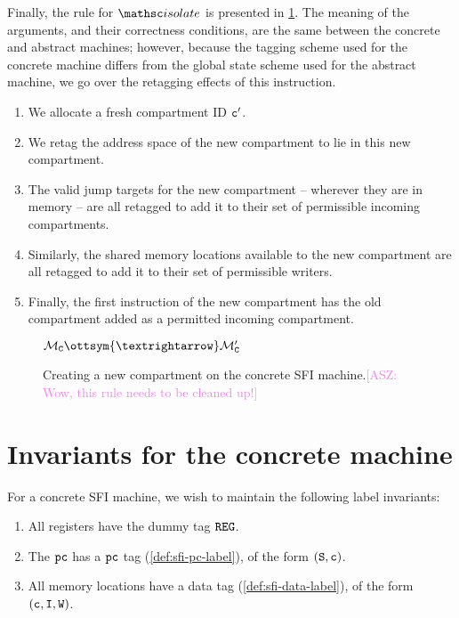 \documentclass[12pt]{amsart}
\newif\ifdraft\drafttrue
\newcommand{\asz}[1]{\ifdraft\textcolor{violet}{[ASZ: #1]}\fi}
\begin{document}
Finally, the rule for $\opcode{isolate}$ is presented in
\cref{fig:sfi-concrete-step-isolate}.  The meaning of the arguments, and their
correctness conditions, are the same between the concrete and abstract machines;
however, because the tagging scheme used for the concrete machine differs from
the global state scheme used for the abstract machine, we go over the retagging
effects of this instruction.
\begin{enumerate}
\item We allocate a fresh compartment ID $\mathtt{c}'$.
  
\item We retag the address space of the new compartment to lie in this new
  compartment.

\item The valid jump targets for the new compartment -- wherever they are in
  memory -- are all retagged to add it to their set of permissible incoming
  compartments.

\item Similarly, the shared memory locations available to the new compartment
  are all retagged to add it to their set of permissible writers.

\item Finally, the first instruction of the new compartment has the old
  compartment added as a permitted incoming compartment.
\end{enumerate}

\begin{figure}
  \begin{ottdefnblock}{$\mathcal{M}_{\concrete{C}} \ottsym{→} \mathcal{M}_{\concrete{C}}'$}
                      {}
    \ottusedrule{\hspace*{-2em}\ottdrulecstepXXisolate{}}
  \end{ottdefnblock}\vspace{-\baselineskip}
  \caption{Creating a new compartment on the concrete SFI machine.\asz{Wow, this
      rule needs to be cleaned up!}}
  \label{fig:sfi-concrete-step-isolate}
\end{figure}

\section{Invariants for the concrete machine}

\begin{definition}\label{def:sfi-label-invariants}
  For a concrete SFI machine, we wish to maintain the following label
  invariants:
  
  \begin{enumerate}
  \item All registers have the dummy tag $\mathtt{REG}$.
  \item The $\mathtt{pc}$ has a $\mathtt{pc}$ tag (\cref{def:sfi-pc-label}), of the form
    $(\mathtt{S},\mathtt{c})$.
  \item All memory locations have a data tag (\cref{def:sfi-data-label}), of the
    form $(\mathtt{c},\mathtt{I},\mathtt{W})$.
  \end{enumerate}
\end{definition}
\end{document}
